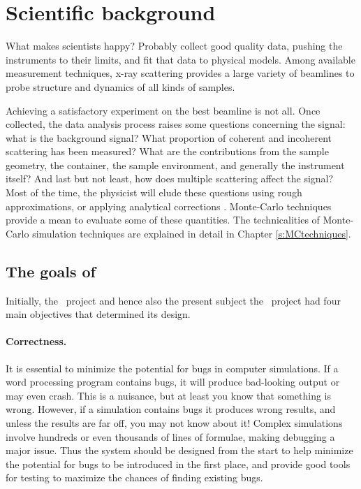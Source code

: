\section{Scientific background}
What makes scientists happy? Probably collect good quality data, pushing the instruments to their limits, and fit that data to physical models.
Among available measurement techniques, x-ray scattering provides a
large variety of beamlines to probe structure and dynamics of all
kinds of samples.


Achieving a satisfactory experiment on the best beamline is not all. Once collected, the data analysis process
raises some questions concerning the signal: what is the background
signal? What proportion of coherent and incoherent scattering has
been measured? What are the contributions from the sample geometry, the
container, the sample environment, and generally the instrument
itself? And last but not least, how does multiple scattering affect the
signal? Most of the time, the physicist will elude these questions
using rough approximations, or applying analytical corrections
\cite{Copley86}. Monte-Carlo techniques provide a mean to evaluate
some of these quantities. The technicalities of Monte-Carlo simulation
techniques are explained in detail in Chapter \ref{s:MCtechniques}.


\subsection{The goals of \MCX}
\label{s:goals}

Initially, the \MCS\ project and hence also the present subject the \MCX\ project had four main objectives
that determined its design.

\paragraph{Correctness.}
It is essential to minimize the potential for bugs in computer
simulations.  If a word processing program contains bugs, it will
produce bad-looking output or may even crash. This is a nuisance, but at
least you know that something is wrong. However, if a simulation
contains bugs it produces wrong results, and unless the results are far
off, you may not know about it! Complex simulations involve hundreds or
even thousands of lines of formulae, making debugging a major issue. Thus the
system should be designed from the start to help minimize the potential
for bugs to be introduced in the first place, and provide good tools for
testing to maximize the chances of finding existing bugs.
%
